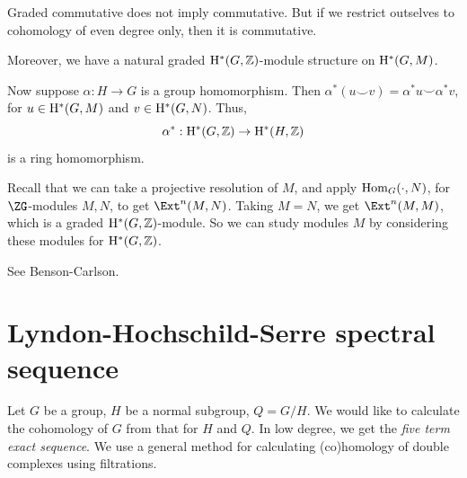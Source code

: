 \documentclass{article}
\begin{document}
\begin{remark}
    Graded commutative does not imply commutative. But if we restrict outselves to cohomology of even degree only, then it is commutative.
\end{remark}

Moreover, we have a natural graded \(\mathrm{H}^*(G, \mathbb{Z})\)-module structure on \(\mathrm{H}^*(G, M)\).

Now suppose \(\alpha : H \to G\) is a group homomorphism. Then \(\alpha^*(u \smile v) = \alpha^*u \smile \alpha^*v\), for \(u \in \mathrm{H}^*(G, M)\) and \(v \in \mathrm{H}^*(G, N)\). Thus,
\[\alpha^* : \mathrm{H}^*(G, \mathbb{Z}) \to \mathrm{H}^*(H, \mathbb{Z})\]
is a ring homomorphism.

\begin{remark}
    Recall that we can take a projective resolution of \(M\), and apply \(\operatorname{Hom}_G(\cdot, N)\), for \(\ZG\)-modules \(M, N\), to get \(\Ext^n(M, N)\). Taking \(M = N\), we get \(\Ext^n(M, M)\), which is a graded \(\mathrm{H}^*(G, \mathbb{Z})\)-module. So we can study modules \(M\) by considering these modules for \(\mathrm{H}^*(G, \mathbb{Z})\).

    See Benson-Carlson.
\end{remark}

\section{Lyndon-Hochschild-Serre spectral sequence}

Let \(G\) be a group, \(H\) be a normal subgroup, \(Q = G/H\). We would like to calculate the cohomology of \(G\) from that for \(H\) and \(Q\). In low degree, we get the \emph{five term exact sequence}. We use a general method for calculating (co)homology of double complexes using filtrations. 
\end{document}
